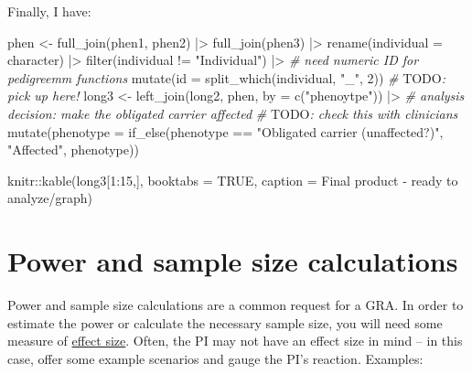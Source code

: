 \documentclass[
]{book}
\newenvironment{Shaded}{\begin{snugshade}}{\end{snugshade}}
\newcommand{\AlertTok}[1]{\textcolor[rgb]{0.94,0.16,0.16}{#1}}
\newcommand{\AttributeTok}[1]{\textcolor[rgb]{0.77,0.63,0.00}{#1}}
\newcommand{\CommentTok}[1]{\textcolor[rgb]{0.56,0.35,0.01}{\textit{#1}}}
\newcommand{\ConstantTok}[1]{\textcolor[rgb]{0.00,0.00,0.00}{#1}}
\newcommand{\DecValTok}[1]{\textcolor[rgb]{0.00,0.00,0.81}{#1}}
\newcommand{\FunctionTok}[1]{\textcolor[rgb]{0.00,0.00,0.00}{#1}}
\newcommand{\NormalTok}[1]{#1}
\newcommand{\OtherTok}[1]{\textcolor[rgb]{0.56,0.35,0.01}{#1}}
\newcommand{\SpecialCharTok}[1]{\textcolor[rgb]{0.00,0.00,0.00}{#1}}
\newcommand{\StringTok}[1]{\textcolor[rgb]{0.31,0.60,0.02}{#1}}
\begin{document}
Finally, I have:

\begin{Shaded}
\begin{Highlighting}[]
\NormalTok{phen }\OtherTok{\textless{}{-}} \FunctionTok{full\_join}\NormalTok{(phen1, phen2) }\SpecialCharTok{|\textgreater{}} 
  \FunctionTok{full\_join}\NormalTok{(phen3) }\SpecialCharTok{|\textgreater{}} 
  \FunctionTok{rename}\NormalTok{(}\AttributeTok{individual =}\NormalTok{ character) }\SpecialCharTok{|\textgreater{}} 
  \FunctionTok{filter}\NormalTok{(individual }\SpecialCharTok{!=} \StringTok{"Individual"}\NormalTok{) }\SpecialCharTok{|\textgreater{}} 
  \CommentTok{\# need numeric ID for pedigreemm functions }
  \FunctionTok{mutate}\NormalTok{(}\AttributeTok{id =} \FunctionTok{split\_which}\NormalTok{(individual, }\StringTok{"\_"}\NormalTok{, }\DecValTok{2}\NormalTok{))}
\CommentTok{\# }\AlertTok{TODO}\CommentTok{: pick up here! }
\NormalTok{long3 }\OtherTok{\textless{}{-}} \FunctionTok{left\_join}\NormalTok{(long2, phen,}
                   \AttributeTok{by =} \FunctionTok{c}\NormalTok{(}\StringTok{"phenoytpe"}\NormalTok{)) }\SpecialCharTok{|\textgreater{}}
  \CommentTok{\# analysis decision: make the obligated carrier affected}
  \CommentTok{\# }\AlertTok{TODO}\CommentTok{: check this with clinicians}
  \FunctionTok{mutate}\NormalTok{(}\AttributeTok{phenotype =} \FunctionTok{if\_else}\NormalTok{(phenotype }\SpecialCharTok{==} \StringTok{"Obligated carrier (unaffected?)"}\NormalTok{, }\StringTok{"Affected"}\NormalTok{, phenotype))}

\NormalTok{knitr}\SpecialCharTok{::}\FunctionTok{kable}\NormalTok{(long3[}\DecValTok{1}\SpecialCharTok{:}\DecValTok{15}\NormalTok{,],}
       \AttributeTok{booktabs =} \ConstantTok{TRUE}\NormalTok{,}
       \AttributeTok{caption =} \StringTok{\textquotesingle{}Final product {-} ready to analyze/graph\textquotesingle{}}\NormalTok{)}
\end{Highlighting}
\end{Shaded}

\hypertarget{power-and-sample-size-calculations}{%
\chapter{Power and sample size calculations}\label{power-and-sample-size-calculations}}

Power and sample size calculations are a common request for a GRA. In order to estimate the power or calculate the necessary sample size, you will need some measure of \href{https://en.wikipedia.org/wiki/Effect_size}{effect size}. Often, the PI may not have an effect size in mind -- in this case, offer some example scenarios and gauge the PI's reaction. Examples:
\end{document}
